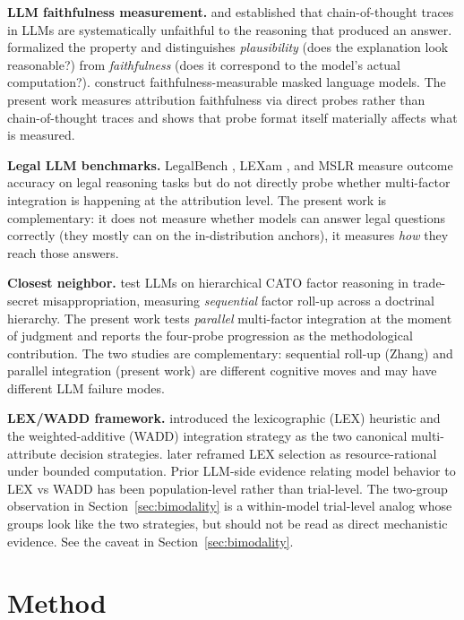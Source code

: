\documentclass[11pt]{article}
\begin{document}
\textbf{LLM faithfulness measurement.} \citet{turpin2023} and \citet{lanham2023} established that chain-of-thought traces in LLMs are systematically unfaithful to the reasoning that produced an answer. \citet{jacovi2020} formalized the property and distinguishes \emph{plausibility} (does the explanation look reasonable?) from \emph{faithfulness} (does it correspond to the model's actual computation?). \citet{madsen2024} construct faithfulness-measurable masked language models. The present work measures attribution faithfulness via direct probes rather than chain-of-thought traces and shows that probe format itself materially affects what is measured.

\textbf{Legal LLM benchmarks.} LegalBench \citep{guha2023}, LEXam \citep{katz2025}, and MSLR \citep{yu2025} measure outcome accuracy on legal reasoning tasks but do not directly probe whether multi-factor integration is happening at the attribution level. The present work is complementary: it does not measure whether models can answer legal questions correctly (they mostly can on the in-distribution anchors), it measures \emph{how} they reach those answers.

\textbf{Closest neighbor.} \citet{zhang2025} test LLMs on hierarchical CATO factor reasoning in trade-secret misappropriation, measuring \emph{sequential} factor roll-up across a doctrinal hierarchy. The present work tests \emph{parallel} multi-factor integration at the moment of judgment and reports the four-probe progression as the methodological contribution. The two studies are complementary: sequential roll-up (Zhang) and parallel integration (present work) are different cognitive moves and may have different LLM failure modes.

\textbf{LEX/WADD framework.} \citet{payne1993} introduced the lexicographic (LEX) heuristic and the weighted-additive (WADD) integration strategy as the two canonical multi-attribute decision strategies. \citet{lieder2020} later reframed LEX selection as resource-rational under bounded computation. Prior LLM-side evidence relating model behavior to LEX vs WADD has been population-level rather than trial-level. The two-group observation in Section~\ref{sec:bimodality} is a within-model trial-level analog whose groups look like the two strategies, but should not be read as direct mechanistic evidence. See the caveat in Section~\ref{sec:bimodality}.

\section{Method}
\end{document}
